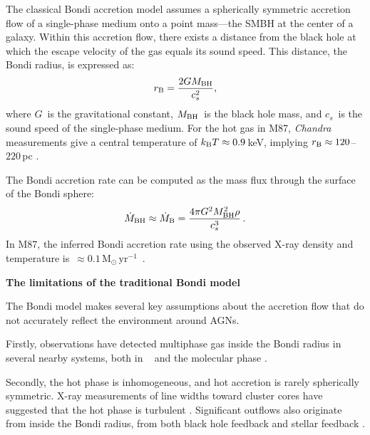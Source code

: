 The classical Bondi accretion model assumes a spherically symmetric accretion flow of a single-phase medium onto a point mass---the SMBH at the center of a galaxy.
Within this accretion flow, there exists a distance from the black hole at which the escape velocity of the gas equals its sound speed.
This distance, the Bondi radius, is expressed as:
\begin{equation}\label{eq:rb}
    r_{\rm B} = \frac{2GM_{\rm BH}}{c^2_{s}},
\end{equation}
where $G$\ is the gravitational constant, $M_{\rm BH}$\ is the black hole mass, and $c_{s}$\ is the sound speed of the single-phase medium.
For the hot gas in M87, \textit{Chandra} measurements give a central temperature of $k_{\rm B}T \approx 0.9$\,keV, implying $r_{\rm B} \approx 120$--$220$\,pc \citep{russell_inside_2015}.

The Bondi accretion rate can be computed as the mass flux through the surface of the Bondi sphere:
\begin{equation}\label{eq:m-dot-bondi}
    \dot{M}_{\rm BH} \approx \dot{M}_{\rm B} = \frac{4\pi G^2 M^2_{\rm BH}\rho}{c^3_{s}}\,.
\end{equation}
In M87, the inferred Bondi accretion rate using the observed X-ray density and temperature is \mdotb\,$\approx 0.1\,\mathrm{M_{\odot}\,yr^{-1}}$\ \citep[][]{russell_inside_2015}.

\centerline{\textbf{The limitations of the traditional Bondi model}} \label{subsec:bondi-limit}

The Bondi model makes several key assumptions about the accretion flow that do not accurately reflect the environment around AGNs.

Firstly, observations have detected multiphase gas inside the Bondi radius in several nearby systems, both in \halpha\ \citep[e.g.,][]{conselice_nature_2001,boselli_virgo_2019} and the molecular phase \citep[e.g.,][]{combes_alma_2019, hsieh_circumnuclear_2021}.


Secondly, the hot phase is inhomogeneous, and hot accretion is rarely spherically symmetric. X-ray measurements of line widths toward cluster cores have suggested that the hot phase is turbulent \citep[e.g.,][]{zhuravleva_turbulent_2014,hitomi_collaboration_atmospheric_2018}. Significant outflows also originate from inside the Bondi radius, from both black hole feedback \citep[e.g.,][]{mcnamara_heating_2005} and stellar feedback \citep[e.g.,][]{hopkins_stellar_2016}.

